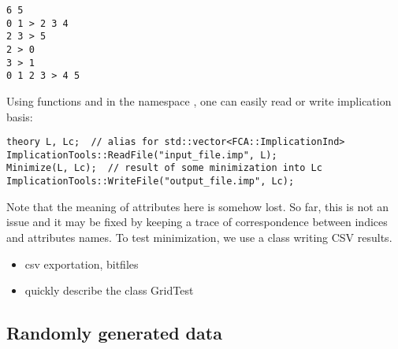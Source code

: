 \begin{lstlisting}[language = inline, style = Light]
6 5
0 1 > 2 3 4
2 3 > 5
2 > 0
3 > 1
0 1 2 3 > 4 5
\end{lstlisting}

\noindent Using functions  and  in the namespace , one can easily read or write implication basis:

\begin{lstlisting}[language = CoreCpp, style = Light]
theory L, Lc;  // alias for std::vector<FCA::ImplicationInd>
ImplicationTools::ReadFile("input_file.imp", L);
Minimize(L, Lc);  // result of some minimization into Lc
ImplicationTools::WriteFile("output_file.imp", Lc);
\end{lstlisting}

\noindent Note that the meaning of attributes here is somehow lost. So far, this is not an issue and it may be fixed by keeping a trace of correspondence between indices and attributes names. To test minimization, we use a class
 writing CSV results.



\begin{itemize}
	\item csv exportation, bitfiles
	\item quickly describe the class GridTest
\end{itemize}

\subsection{Randomly generated data}

